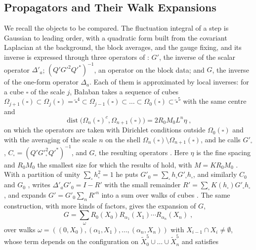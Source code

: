 \documentclass[11pt]{preprint}
\newcommand{\dist}{\operatorname{dist}}
\numberwithin{equation}{section}
\theoremstyle{definition}
\theoremstyle{remark}
\theoremstyle{plain}
\begin{document}
\subsection{Propagators and Their Walk Expansions}\label{sec:walk-expansions}

We recall the objects to be compared. The fluctuation integral of a step is Gaussian to leading order, with a quadratic form built from the covariant Laplacian at the background, the block averages, and the gauge fixing, and its inverse is expressed through three operators of \cite{BalabanPBG}: $G'$, the inverse of the scalar operator $\Delta'_a$; $(Q'G'^2Q'^*)^{-1}$, an operator on the block data; and $G$, the inverse of the one-form operator $\Delta_a$. Each of them is approximated by local inverses: for a cube $\square$ of the scale $j$, Ba{\l}aban takes a sequence of cubes $\Omega_{j+1}(\square) \subset \Omega_j(\square) = \tilde\square^4 \subset \Omega_{j-1}(\square) \subset \dots \subset \Omega_0(\square) \subset \tilde\square^5$ with the same centre and
\begin{equation}\label{eq:local-sequence}
    \dist\bigl(\Omega_n(\square)^c, \Omega_{n+1}(\square)\bigr) = 2R_0M_0L^n\eta\;,
\end{equation}
on which the operators are taken with Dirichlet conditions outside $\Omega_0(\square)$ and with the averaging of the scale $n$ on the shell $\Omega_n(\square) \setminus \Omega_{n+1}(\square)$, and he calls $G'_\square$, $C_\square = (Q'G'^2_\square Q'^*)^{-1}$, and $G_\square$ the resulting operators \cite[pp.~408--409]{BalabanPBG}. Here $\eta$ is the fine spacing and $R_0M_0$ the smallest size for which the results of \cite{BalabanPRT2} hold, with $M = KR_0M_0$ \cite[p.~408]{BalabanPBG}. With a partition of unity $\sum_\square h_\square^2 = 1$ he puts $G'_0 = \sum_\square h_\square G'_\square h_\square$, and similarly $C_0$ and $G_0$ \cite[(3.87), p.~409]{BalabanPBG}, writes $\Delta'_aG'_0 = I - R'$ with the small remainder $R' = \sum_\square K(h_\square)G'_\square h_\square$ \cite[(3.88)--(3.89), p.~409]{BalabanPBG}, and expands $G' = G'_0\sum_nR'^n$ into a sum over walks of cubes \cite[Theorem~3.7, (3.90), p.~409]{BalabanPBG}. The same construction, with more kinds of factors, gives the expansion of $G$,
\begin{equation}\label{eq:walk-expansion}
    G = \sum_\omega R_0(X_0)R_{\alpha_1}(X_1)\cdots R_{\alpha_n}(X_n)\;,
\end{equation}
over walks $\omega = ((0, X_0), (\alpha_1, X_1), \dots, (\alpha_n, X_n))$ with $X_{i-1} \cap X_i \neq \emptyset$, whose term depends on the configuration on $\tilde X_0^5 \cup \dots \cup \tilde X_n^5$ and satisfies
\end{document}
